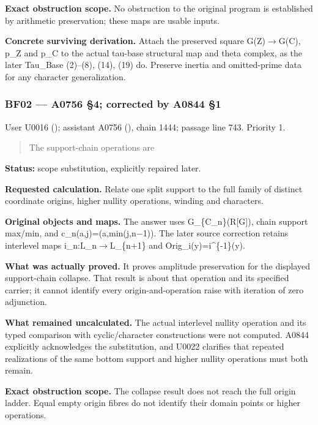 \textbf{Exact obstruction scope.} No obstruction to the original program
is established by arithmetic preservation; these maps are usable inputs.

\textbf{Concrete surviving derivation.} Attach the preserved square
G(Z)\allowbreak{}\ensuremath{→}\allowbreak{}G(C), p\_Z and p\_C to the
actual tau-base structural map and theta complex, as the later Tau\_Base
(2)--(8), (14), (19) do. Preserve inertia and omitted-prime data for any
character generalization.

\subsubsection{BF02 --- A0756 §4; corrected by A0844
§1}\label{TranscriptLedgerStage:bf02-a0756-4-corrected-by-a0844-1}

User U0016 (\protect{});
assistant A0756 (\protect{}),
chain 1444; passage line 743. Priority 1.

\begin{quote}
The support-chain operations are
\end{quote}

\textbf{Status:} scope substitution, explicitly repaired later.

\textbf{Requested calculation.} Relate one split support to the full
family of distinct coordinate origins, higher nullity operations,
winding and characters.

\textbf{Original objects and maps.} The answer uses
G\_\{C\_n\}(R{[}G{]}), chain support max/min, and
c\_n(a,j)=(a,min(j,n\allowbreak{}\ensuremath{−}\allowbreak{}1)). The
later source correction retains interlevel maps
i\_n:L\_n\allowbreak{}\ensuremath{→}\allowbreak{}L\_\{n+1\} and
Orig\_i(y)=i\^{}\{-1\}(y).

\textbf{What was actually proved.} It proves amplitude preservation for
the displayed support-chain collapse. That result is about that
operation and its specified carrier; it cannot identify every
origin-and-operation raise with iteration of zero adjunction.

\textbf{What remained uncalculated.} The actual interlevel nullity
operation and its typed comparison with cyclic/character constructions
were not computed. A0844 explicitly acknowledges the substitution, and
U0022 clarifies that repeated realizations of the same bottom support
and higher nullity operations must both remain.

\textbf{Exact obstruction scope.} The collapse result does not reach the
full origin ladder. Equal empty origin fibres do not identify their
domain points or higher operations.

